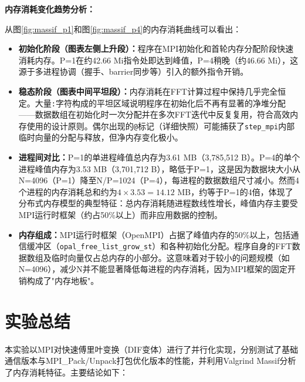 \documentclass{SYSUReport}
\begin{document}
\textbf{内存消耗变化趋势分析：}

从图\ref{fig:massif_p1}和图\ref{fig:massif_p4}的内存消耗曲线可以看出：

\begin{itemize}
    \item \textbf{初始化阶段（图表左侧上升段）：}程序在MPI初始化和首轮内存分配阶段快速消耗内存。P=1在约42.66 Mi指令处即达到峰值，P=4稍晚（约46.66 Mi），这源于多进程协调（握手、barrier同步等）引入的额外指令开销。
    \item \textbf{稳态阶段（图表中间平坦段）：}内存消耗在FFT计算过程中保持几乎完全恒定。大量\texttt{:}字符构成的平坦区域说明程序在初始化后不再有显著的净堆分配——数据数组在初始化时一次分配并在多次FFT迭代中反复复用，符合高效内存使用的设计原则。偶尔出现的\texttt{@}标记（详细快照）可能捕获了\texttt{step\_mpi}内部临时向量的分配与释放，但净内存变化极小。
    \item \textbf{进程间对比：}P=1的单进程峰值总内存为3.61 MB（3,785,512 B）。P=4的单个进程峰值内存为3.53 MB（3,701,712 B），略低于P=1，这是因为数据块大小从N=4096（P=1）降至N/P=1024（P=4），每进程的数据数组尺寸减小。然而4个进程的内存消耗总和约为$4 \times 3.53 = 14.12$ MB，约等于P=1的4倍，体现了分布式内存模型的典型特征：总内存消耗随进程数线性增长，峰值内存主要受MPI运行时框架（约占50\%以上）而非应用数据的控制。
    \item \textbf{内存组成：}MPI运行时框架（OpenMPI）占据了峰值内存的50\%以上，包括通信缓冲区（\texttt{opal\_free\_list\_grow\_st}）和各种初始化分配。程序自身的FFT数据数组及临时向量仅占总内存的小部分。这意味着对于较小的问题规模（如N=4096），减少N并不能显著降低每进程的内存消耗，因为MPI框架的固定开销构成了"内存地板"。
\end{itemize}

\section{实验总结}

本实验以MPI对快速傅里叶变换（DIF变体）进行了并行化实现，分别测试了基础通信版本与MPI\_Pack/Unpack打包优化版本的性能，并利用Valgrind Massif分析了内存消耗特征。主要结论如下：
\end{document}
